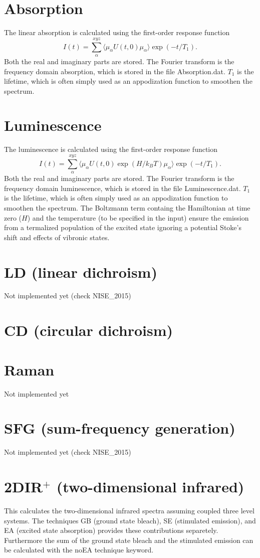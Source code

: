 \section{Absorption}
The linear absorption is calculated using the first-order response function
\begin{equation}
I(t)=\sum_{\alpha}^{xyz}\langle\mu_{\alpha}U(t,0)\mu_{\alpha}\rangle\exp(-t/T_1).
\end{equation}
Both the real and imaginary parts are stored. The Fourier transform is the frequency domain absorption, which is stored in the file Absorption.dat. $T_1$ is the lifetime, which is often simply used as an appodization function to smoothen the spectrum. 
\section{Luminescence}
The luminescence is calculated using the first-order response function
\begin{equation}
I(t)=\sum_{\alpha}^{xyz}\langle\mu_{\alpha}U(t,0)\exp(H/k_BT)\mu_{\alpha}\rangle\exp(-t/T_1).
\end{equation}
Both the real and imaginary parts are stored. The Fourier transform is the frequency domain luminescence, which is stored in the file Luminescence.dat. $T_1$ is the lifetime, which is often simply used as an appodization function to smoothen the spectrum. The Boltzmann term containg the Hamiltonian at time zero ($H$) and the temperature (to be specified in the input) ensure the emission from a termalized population of the excited state ignoring a potential Stoke's shift and effects of vibronic states. 
\section{LD (linear dichroism)}
Not implemented yet (check NISE\_2015)
\section{CD (circular dichroism)}
\section{Raman}
Not implemented yet
\section{SFG (sum-frequency generation)}
Not implemented yet (check NISE\_2015)
\section{2DIR$^{+}$ (two-dimensional infrared)}
This calculates the two-dimensional infrared spectra assuming coupled three level systems. The techniques GB (ground state bleach), SE (stimulated emission), and EA (excited state absorption) provides these contributions separetely. Furthermore the sum of the ground state bleach and the stimulated emission can be calculated with the noEA technique keyword. 
